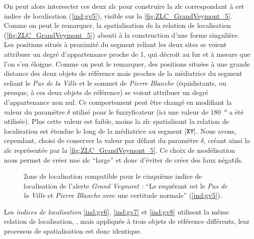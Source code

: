 On peut alors intersecter ces deux \ac{zlc} pour construire la
\ac{zlc} correspondant à cet indice de localisation (\ref{ind:gv5}),
visible sur la \autoref{fig:ZLC_GrandVeymont_5}. Comme on peut le
remarquer, la spatialisation de la relation de localisation
 (\autoref{fig:ZLC_GrandVeymont_5}) abouti
à la construction d'une forme singulière. Les positions situés à
proximité du segment reliant les deux sites se voient attribuer un
degré d'appartenance proche de 1, qui décroit au fur et à mesure que
l'on s'en éloigne. Comme on peut le remarquer, des positions situées à
une grande distance des deux objets de référence mais proches de la
médiatrice du segment reliant le \emph{Pas de la Ville} et le sommet
de \emph{Pierre Blanche} (\ie équidistants, ou presque, à ces deux
objets de référence) se voient attribuer un degré d'appartenance non
nul. Ce comportement peut être changé en modifiant la valeur du
paramètre \(\delta\) utilisé pour le fuzzyficateur
 (ici une valeur de \SI{180}{\degree} a été
utilisée). Plus cette valeur est faible, moins la \ac{zlc}
spatialisant la relation de localisation 
est étendue le long de la médiatrice au segment
$[\text{\texttt{XY}}]$. Nous avons, cependant, choisi de conserver la
valeur par défaut du paramètre \(\delta\), créant ainsi la \ac{zlc}
représentée par la \autoref{fig:ZLC_GrandVeymont_5}. Ce choix de
modélisation nous permet de créer une \ac{zlc} \enquote{large} et donc
d'éviter de créer des faux négatifs.

\begin{figure}
  \centering
  
  \caption{2one de localisation compatible pour le cinquième indice de
    localisation de l'alerte \emph{Grand Veymont :} \enquote{Le
      requérant est \protect{} le \emph{Pas
        de la Ville} et \emph{Pierre Blanche} avec une certitude
      normale} (\ref{ind:gv5}).}
  \label{fig:ZLC_GrandVeymont_5}
\end{figure}


Les \emph{indices de localisation} \ref{ind:gv6}, \ref{ind:gv7} et
\ref{ind:gv8} utilisent la même relation de localisation,
, mais appliquée à trois objets de
référence différents, leur processus de spatialisation est donc
identique.

